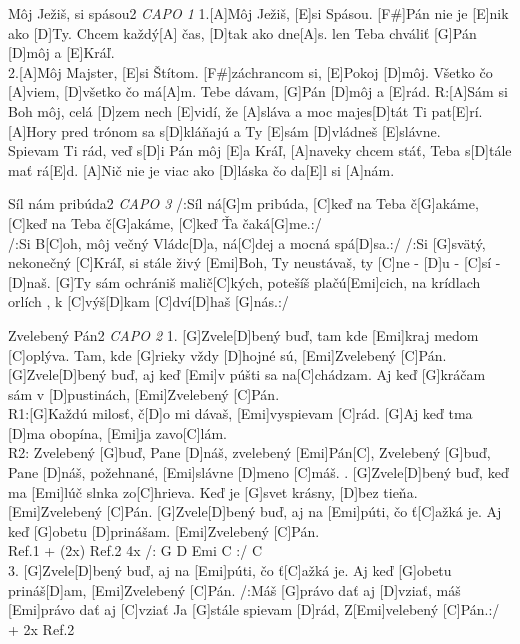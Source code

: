 \documentclass[12pt]{article}
\begin{document}
\begin{song}{Môj Ježiš, si spásou}{2}
	\textit{CAPO 1}
	1.[A]Môj Ježiš, [E]si Spásou.
	[F#]Pán nie je [E]nik ako [D]Ty.
	Chcem každý[A] čas,
	[D]tak ako dne[A]s.
	len Teba chváliť
	[G]Pán [D]môj a [E]Kráľ.
	\\
	2.[A]Môj Majster, [E]si Štítom.
	[F#]záchrancom si, [E]Pokoj [D]môj.
	Všetko čo [A]viem,
	[D]všetko čo má[A]m.
	Tebe dávam,
	[G]Pán [D]môj a [E]rád.
	\columnbreak
	R:[A]Sám si Boh môj, celá [D]zem nech [E]vidí,
	že [A]sláva a moc majes[D]tát Ti pat[E]rí.
	[A]Hory pred trónom sa s[D]kláňajú
	a Ty [E]sám [D]vládneš [E]slávne.
	\\
	[A]Spievam Ti rád, veď s[D]i Pán môj [E]a Kráľ,
	[A]naveky chcem stáť, Teba s[D]tále mať rá[E]d.
	[A]Nič nie je viac ako [D]láska čo da[E]l si [A]nám.
\end{song}

\begin{song}{Síl nám pribúda}{2}
	\textit{CAPO 3}
	/:Síl ná[G]m pribúda, 
	[C]keď na Teba č[G]akáme,
	[C]keď na Teba č[G]akáme,
	[C]keď Ťa čaká[G]me.:/
	\\
	/:Si B[C]oh, môj večný Vládc[D]a,
	ná[C]dej a mocná spá[D]sa.:/
	\columnbreak
	/:Si [G]svätý, nekonečný [C]Kráľ,
	si stále živý [Emi]Boh,
	Ty neustávaš, ty [C]ne - [D]u - [C]sí - [D]naš.
	[G]Ty sám ochrániš malič[C]kých,
	potešíš plačú[Emi]cich,
	na krídlach orlích ,
	k [C]výš[D]kam [C]dví[D]haš [G]nás.:/
\end{song}

\begin{song}{Zvelebený Pán}{2}
	\textit{CAPO 2}
	1. [G]Zvele[D]bený buď, 
	tam kde [Emi]kraj medom [C]oplýva.
	Tam, kde [G]rieky vždy [D]hojné sú,
	[Emi]Zvelebený [C]Pán.
	[G]Zvele[D]bený buď, 
	aj keď [Emi]v púšti sa na[C]chádzam.
	Aj keď [G]kráčam sám v [D]pustinách,
	[Emi]Zvelebený [C]Pán.
	\\
	R1:[G]Každú milosť, č[D]o mi dávaš,
	[Emi]vyspievam [C]rád.
	[G]Aj keď tma [D]ma obopína,
	[Emi]ja zavo[C]lám.
	\\
	R2: Zvelebený [G]buď, Pane [D]náš,
	zvelebený [Emi]Pán[C],
	Zvelebený [G]buď, Pane [D]náš,
	požehnané, [Emi]slávne [D]meno [C]máš.
	. [G]Zvele[D]bený buď, 
	keď ma [Emi]lúč slnka zo[C]hrieva.
	Keď je [G]svet krásny, [D]bez tieňa.
	[Emi]Zvelebený [C]Pán.
	[G]Zvele[D]bený buď, 
	aj na [Emi]púti, čo ť[C]ažká je.
	Aj keď [G]obetu [D]prinášam.
	[Emi]Zvelebený [C]Pán.
	\\
	Ref.1 + (2x) Ref.2
	4x /: G D Emi C :/ C
	\\
	3. [G]Zvele[D]bený buď, 
	aj na [Emi]púti, čo ť[C]ažká je.
	Aj keď [G]obetu prináš[D]am, 
	[Emi]Zvelebený [C]Pán.
	/:Máš [G]právo dať aj [D]vziať, 
	máš [Emi]právo dať aj [C]vziať
	Ja [G]stále spievam [D]rád, 
	Z[Emi]velebený [C]Pán.:/ + 2x Ref.2
\end{song}
\end{document}
